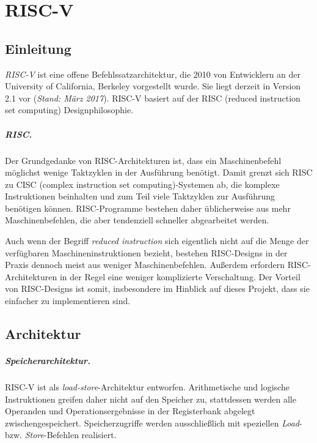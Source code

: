 \chapter{RISC-V} %
\label{RISC-V} %

\section{Einleitung}
\emph{RISC-V} ist eine offene Befehlssatzarchitektur, die 2010 von
Entwicklern an der University of California, Berkeley vorgestellt wurde.
Sie liegt derzeit in Version 2.1 vor (\textit{Stand: März 2017}). RISC-V
basiert auf der RISC (reduced instruction set computing) Designphilosophie.

\paragraph{RISC.} Der Grundgedanke von RISC-Architekturen ist, dass ein Maschinenbefehl möglichst wenige Taktzyklen in der Ausführung benötigt. Damit grenzt sich RISC zu CISC (complex instruction set computing)-Systemen ab, die komplexe Instruktionen beinhalten und zum Teil viele Taktzyklen zur Ausführung benötigen können. RISC-Programme bestehen daher üblicherweise aus mehr Maschinenbefehlen, die aber tendenziell schneller abgearbeitet werden.

Auch wenn der Begriff \textit{reduced instruction} sich
eigentlich nicht auf die Menge der verfügbaren Maschineninstruktionen
bezieht, bestehen RISC-Designs in der Praxis dennoch meist aus weniger
Maschinenbefehlen. Außerdem erfordern RISC-Architekturen in der Regel eine weniger komplizierte Verschaltung. \cite{DBLP:conf/sipew/IsenJJ09} Der Vorteil von RISC-Designs ist somit, insbesondere im Hinblick auf dieses Projekt, dass sie einfacher zu implementieren sind.

\section{Architektur}
\label{subsec:Register}

\paragraph{Speicherarchitektur.} RISC-V ist als
\textit{load-store}-Architektur entworfen. Arithmetische und logische
Instruktionen greifen daher nicht auf den Speicher zu, stattdessen
werden alle Operanden und Operationsergebnisse in der Registerbank
abgelegt zwischengespeichert.
Speicherzugriffe werden ausschließlich mit speziellen \textit{Load}- bzw. \textit{Store}-Befehlen realisiert.

